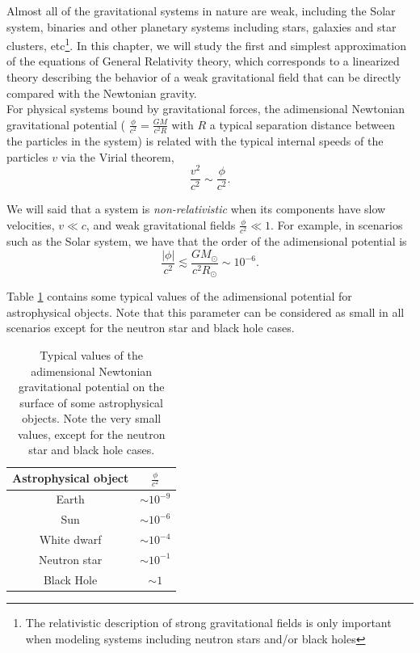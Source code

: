 Almost all of the gravitational systems in nature are weak, including the Solar system, binaries and other planetary systems including stars, galaxies and star clusters, etc\footnote{The relativistic description of strong gravitational fields is only important when modeling systems including neutron stars and/or black holes}. In this chapter, we will study the first and simplest approximation of the equations of General Relativity theory, which corresponds to a linearized theory describing the behavior of a weak gravitational field that can be directly compared with the Newtonian gravity. \\
For physical systems bound by gravitational forces, the adimensional Newtonian gravitational potential ( $\frac{\phi}{c^2} = \frac{GM}{c^2 R}$ with $R$ a typical separation distance between the particles in the system)  is related with the typical internal speeds of the particles $v$ via the Virial theorem,
\begin{equation}
\frac{v^2}{c^2} \sim \frac{\phi}{c^2}. \label{eq:VirialTheorem}
\end{equation}

We will said that a system is \textit{non-relativistic} when its components have slow velocities, $v\ll c$, and weak gravitational fields $\frac{\phi}{c^2}\ll 1$. For example, in scenarios such as the Solar system, we have that the order of the adimensional potential is
\begin{equation}
\frac{\left| \phi \right|}{c^2} \lesssim \frac{G M_{\odot }}{c^2 R_{\odot }} \sim 10^{-6}. \label{eq:SolarSystemPotentialOrder}
\end{equation}

Table \ref{tab:NewtonianPotentialSolarSystem} contains some typical values of the adimensional potential for astrophysical objects. Note that this parameter can be considered as small in all scenarios except for the neutron star and black hole cases. 

\begin{table}[h]
\centering
\footnotesize
\begin{tabular}{|c|c|}
\hline
Astrophysical object & $\frac{\phi}{c^2}$\\
\hline
Earth & $\sim 10^{-9}$ \\
Sun & $\sim 10^{-6}$ \\
White dwarf	 & $\sim 10^{-4}$ \\
Neutron star	& $\sim 10^{-1}$ \\
Black Hole & $\sim 1$ \\
\hline
\end{tabular}
\caption{Typical values of the adimensional Newtonian gravitational potential on the surface of some astrophysical objects. Note the very small values, except for the neutron star and black hole cases.}
\label{tab:NewtonianPotentialSolarSystem}
\end{table}

